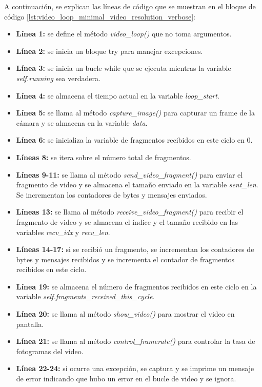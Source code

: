 A continuación, se explican las líneas de código que se muestran en el bloque de código \ref{lst:video_loop_minimal_video_resolution_verbose}:
\begin{itemize}
    \item \textbf{Línea 1:} se define el método \textit{video\_loop()} que no toma argumentos.
    \item \textbf{Línea 2:} se inicia un bloque try para manejar excepciones.
    \item \textbf{Línea 3:} se inicia un bucle while que se ejecuta mientras la variable \textit{self.running} sea verdadera.
    \item \textbf{Línea 4:} se almacena el tiempo actual en la variable \textit{loop\_start}.
    \item \textbf{Línea 5:} se llama al método \textit{capture\_image()} para capturar un frame de la cámara y se almacena en la variable \textit{data}.
    \item \textbf{Línea 6:} se inicializa la variable de fragmentos recibidos en este ciclo en 0.
    \item \textbf{Líneas 8:} se itera sobre el número total de fragmentos.
    \item \textbf{Líneas 9-11:} se llama al método \textit{send\_video\_fragment()} para enviar el fragmento de video y se almacena el tamaño enviado en la variable \textit{sent\_len}. Se incrementan los contadores de bytes y mensajes enviados.
    \item \textbf{Líneas 13:} se llama al método \textit{receive\_video\_fragment()} para recibir el fragmento de video y se almacena el índice y el tamaño recibido en las variables \textit{recv\_idx} y \textit{recv\_len}.
    \item \textbf{Líneas 14-17:} si se recibió un fragmento, se incrementan los contadores de bytes y mensajes recibidos y se incrementa el contador de fragmentos recibidos en este ciclo.
    \item \textbf{Línea 19:} se almacena el número de fragmentos recibidos en este ciclo en la variable \textit{self.fragments\_received\_this\_cycle}.
    \item \textbf{Línea 20:} se llama al método \textit{show\_video()} para mostrar el video en pantalla.
    \item \textbf{Línea 21:} se llama al método \textit{control\_framerate()} para controlar la tasa de fotogramas del video.
    \item \textbf{Línea 22-24:} si ocurre una excepción, se captura y se imprime un mensaje de error indicando que hubo un error en el bucle de video y se ignora.
\end{itemize}
\vspace{\baselineskip}

